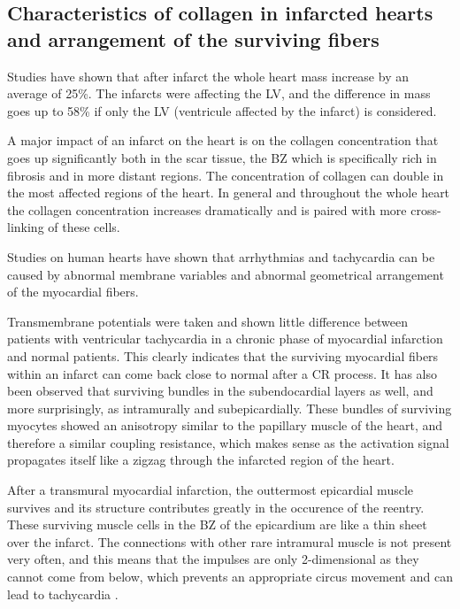 \subsection{Characteristics of collagen in infarcted hearts and arrangement of the surviving fibers} \label{surviving_fibers}

Studies \cite{mccormick1994regional} have shown that after infarct the whole heart mass increase by an average of 25\%. The infarcts were affecting the LV, and the difference in mass goes up to 58\% if only the LV (ventricule affected by the infarct) is considered.

A major impact of an infarct on the heart is on the collagen concentration that goes up significantly both in the scar tissue, the BZ which is specifically rich in fibrosis and in more distant regions. The concentration of collagen can double in the most affected regions of the heart. In general and throughout the whole heart the collagen concentration increases dramatically and is paired with more cross-linking of these cells.

Studies on human hearts \cite{de1990ventricular} have shown that arrhythmias and tachycardia can be caused by abnormal membrane variables and abnormal geometrical arrangement of the myocardial fibers.

Transmembrane potentials were taken and shown little difference between patients with ventricular tachycardia in a chronic phase of myocardial infarction and normal patients. This clearly indicates that the surviving myocardial fibers within an infarct can come back close to normal after a CR process. It has also been observed that surviving bundles in the subendocardial layers as well, and more surprisingly, as intramurally and subepicardially. These bundles of surviving myocytes showed an anisotropy similar to the papillary muscle of the heart, and therefore a similar coupling resistance, which makes sense as the activation signal propagates itself like a zigzag through the infarcted region of the heart.

After a transmural myocardial infarction, the outtermost epicardial muscle survives and its structure contributes greatly in the occurence of the reentry. These surviving muscle cells in the BZ of the epicardium are like a thin sheet over the infarct. The connections with other rare intramural muscle is not present very often, and this means that the impulses are only 2-dimensional as they cannot come from below, which prevents an appropriate circus movement and can lead to tachycardia \cite{ursell1985structural}.
